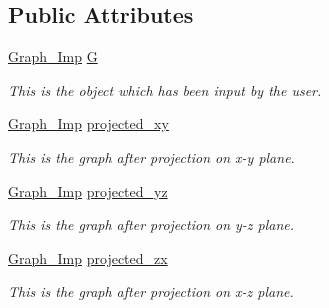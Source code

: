 \subsection*{Public Attributes}
\begin{DoxyCompactItemize}
\item 
\mbox{\label{class_three___d__to___two___d_a052601fc401081c404b4f915c0e7fd42}} 
\mbox{\hyperlink{class_graph___imp}{Graph\+\_\+\+Imp}} \mbox{\hyperlink{class_three___d__to___two___d_a052601fc401081c404b4f915c0e7fd42}{G}}
\begin{DoxyCompactList}\small\item\em This is the object which has been input by the user. \end{DoxyCompactList}\item 
\mbox{\label{class_three___d__to___two___d_a4c2a10bbaa546ce8fb6ea1ecc2e51ea8}} 
\mbox{\hyperlink{class_graph___imp}{Graph\+\_\+\+Imp}} \mbox{\hyperlink{class_three___d__to___two___d_a4c2a10bbaa546ce8fb6ea1ecc2e51ea8}{projected\+\_\+xy}}
\begin{DoxyCompactList}\small\item\em This is the graph after projection on x-\/y plane. \end{DoxyCompactList}\item 
\mbox{\label{class_three___d__to___two___d_a9f4acfdc86df27c3e0772884cd71bcba}} 
\mbox{\hyperlink{class_graph___imp}{Graph\+\_\+\+Imp}} \mbox{\hyperlink{class_three___d__to___two___d_a9f4acfdc86df27c3e0772884cd71bcba}{projected\+\_\+yz}}
\begin{DoxyCompactList}\small\item\em This is the graph after projection on y-\/z plane. \end{DoxyCompactList}\item 
\mbox{\label{class_three___d__to___two___d_af1026f5bd3bf034cb40be96c6ec1889a}} 
\mbox{\hyperlink{class_graph___imp}{Graph\+\_\+\+Imp}} \mbox{\hyperlink{class_three___d__to___two___d_af1026f5bd3bf034cb40be96c6ec1889a}{projected\+\_\+zx}}
\begin{DoxyCompactList}\small\item\em This is the graph after projection on x-\/z plane. \end{DoxyCompactList}\item 

\end{DoxyCompactItemize}
